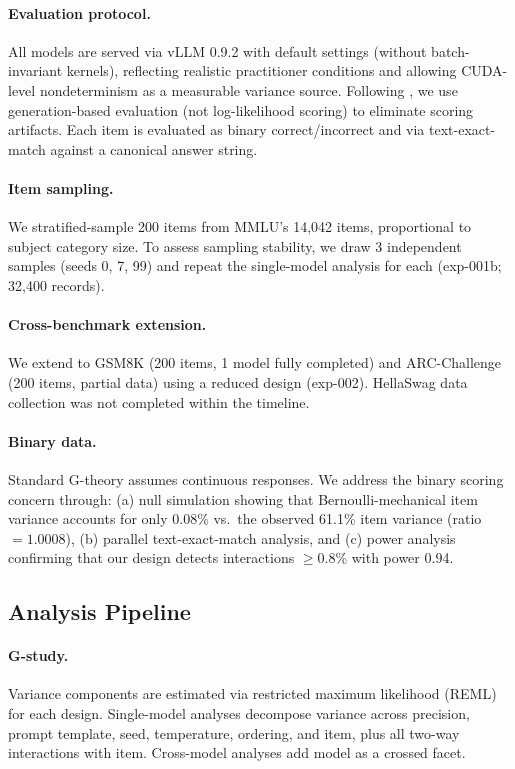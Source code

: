 \documentclass[letterpaper]{article}
\begin{document}
\paragraph{Evaluation protocol.}
All models are served via vLLM 0.9.2 with default settings (without batch-invariant kernels), reflecting realistic practitioner conditions and allowing CUDA-level nondeterminism as a measurable variance source. Following \citet{hua2025mmlu}, we use generation-based evaluation (not log-likelihood scoring) to eliminate scoring artifacts. Each item is evaluated as binary correct/incorrect and via text-exact-match against a canonical answer string.

\paragraph{Item sampling.}
We stratified-sample 200 items from MMLU's 14,042 items, proportional to subject category size. To assess sampling stability, we draw 3 independent samples (seeds 0, 7, 99) and repeat the single-model analysis for each (exp-001b; 32,400 records).

\paragraph{Cross-benchmark extension.}
We extend to GSM8K (200 items, 1 model fully completed) and ARC-Challenge (200 items, partial data) using a reduced design (exp-002). HellaSwag data collection was not completed within the timeline.

\paragraph{Binary data.}
Standard G-theory assumes continuous responses. We address the binary scoring concern through: (a) null simulation showing that Bernoulli-mechanical item variance accounts for only 0.08\% vs.\ the observed 61.1\% item variance (ratio $= 1.0008$), (b) parallel text-exact-match analysis, and (c) power analysis confirming that our design detects interactions $\geq$0.8\% with power 0.94.

\subsection{Analysis Pipeline}

\paragraph{G-study.} Variance components are estimated via restricted maximum likelihood (REML) for each design. Single-model analyses decompose variance across precision, prompt template, seed, temperature, ordering, and item, plus all two-way interactions with item. Cross-model analyses add model as a crossed facet.
\end{document}
